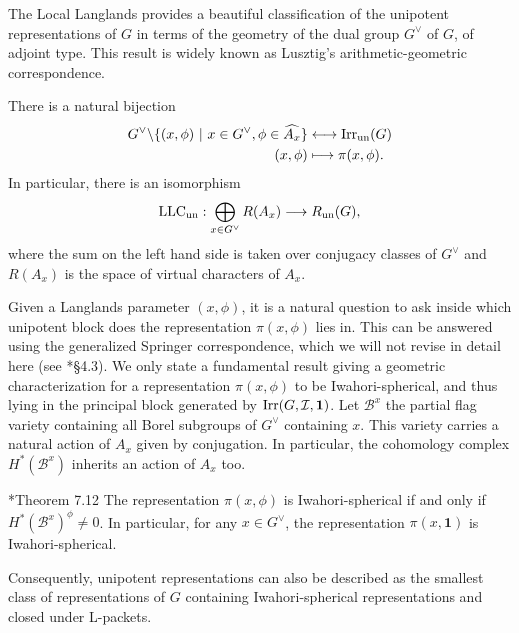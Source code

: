 The Local Langlands provides a beautiful classification of the unipotent representations of $G$ in terms of the geometry of the dual group $G^\vee$ of $G$, of adjoint type. This result is widely known as Lusztig's arithmetic-geometric correspondence.
\begin{theorem} There is a natural bijection
    \begin{align*}
        G^\vee\backslash\{(x,\phi)\ |\ x\in G^\vee,\phi\in\widehat{A_x}\}&\longleftrightarrow \mathrm{Irr}_{\mathrm{un}}(G)\\
        (x,\phi)&\longmapsto \pi(x,\phi).
    \end{align*}
    In particular, there is an isomorphism
    \begin{equation}\label{eqn:arithmetic-geometric}
        \mathrm{LLC}_{\mathrm{un}}:\bigoplus_{x\in G^\vee}R(A_x)\longrightarrow R_{\mathrm{un}}(G),
    \end{equation}
    where the sum on the left hand side is taken over conjugacy classes of $G^\vee$ and $R(A_x)$ is the space of virtual characters of $A_x$.
\end{theorem}

Given a Langlands parameter $(x,\phi)$, it is a natural question to ask inside which unipotent block does the representation $\pi(x,\phi)$ lies in. This can be answered using the generalized Springer correspondence, which we will not revise in detail here (see \cite{CiubotaruMasonBrownOkada2025}*{\S4.3}). We only state a fundamental result giving a geometric characterization for a representation $\pi(x,\phi)$ to be Iwahori-spherical, and thus lying in the principal block generated by $\mathrm{Irr}(G,\mathcal{I},\mathbf{1})$. Let $\mathcal{B}^x$ the partial flag variety containing all Borel subgroups of $G^\vee$ containing $x$. This variety carries a natural action of $A_x$ given by conjugation. In particular, the cohomology complex $H^*(\mathcal{B}^x)$ inherits an action of $A_x$ too.

\begin{theorem}\cite{KazhdanLusztig1987}*{Theorem 7.12}
    The representation $\pi(x,\phi)$ is Iwahori-spherical if and only if $H^*(\mathcal{B}^x)^\phi\neq 0$. In particular, for any $x\in G^\vee$, the representation $\pi(x,\mathbf{1})$ is Iwahori-spherical.
\end{theorem}
Consequently, unipotent representations can also be described as the smallest class of representations of $G$ containing Iwahori-spherical representations and closed under L-packets.


